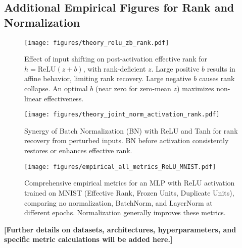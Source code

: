 \documentclass{article}
\begin{document}
\subsection{Additional Empirical Figures for Rank and Normalization}
\label{app:additional_empirical_rank_figures}

\begin{figure}[h!]
    \centering
    \texttt{[image: figures/theory\_relu\_zb\_rank.pdf]}
    \caption{Effect of input shifting on post-activation effective rank for $h = \mathrm{ReLU}(z+b)$, with rank-deficient $z$. Large positive $b$ results in affine behavior, limiting rank recovery. Large negative $b$ causes rank collapse. An optimal $b$ (near zero for zero-mean $z$) maximizes non-linear effectiveness.}
    \label{fig:theory_relu_zb_rank_appendix}
\end{figure}

\begin{figure}[h!]
    \centering
    \texttt{[image: figures/theory\_joint\_norm\_activation\_rank.pdf]}
    \caption{Synergy of Batch Normalization (BN) with ReLU and Tanh for rank recovery from perturbed inputs. BN before activation consistently restores or enhances effective rank.}
    \label{fig:theory_joint_norm_activation_rank_appendix}
\end{figure}

\begin{figure}[h!]
    \centering
    \texttt{[image: figures/empirical\_all\_metrics\_ReLU\_MNIST.pdf]}
    \caption{Comprehensive empirical metrics for an MLP with ReLU activation trained on MNIST (Effective Rank, Frozen Units, Duplicate Units), comparing no normalization, BatchNorm, and LayerNorm at different epochs. Normalization generally improves these metrics.}
    \label{fig:empirical_all_metrics_appendix}
\end{figure}

\textbf{[Further details on datasets, architectures, hyperparameters, and specific metric calculations will be added here.]}
\end{document}
